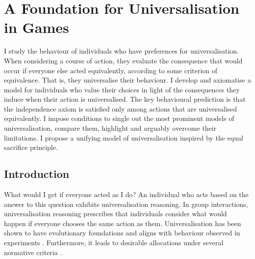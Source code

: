 \renewcommand{\thefootnote}{\fnsymbol{footnote}}

\chapter[A Foundation for Universalisation in Games]%
        {A Foundation for Universalisation in Games\protect\footnotemark}
\label{ch:univ}


\setcounter{footnote}{0}
\renewcommand{\thefootnote}{\arabic{footnote}}


\begin{chapterabstract}
	I study the behaviour of individuals who have preferences for universalisation. When considering a course of action, they evaluate the consequence that would occur if everyone else acted equivalently, according to some criterion of equivalence. That is, they universalise their behaviour. I develop and axiomatise a model for individuals who value their choices in light of the consequences they induce when their action is universalised. The key behavioural prediction is that the independence axiom is satisfied only among actions that are universalised equivalently. I impose conditions to single out the most prominent models of universalisation, compare them, highlight and arguably overcome their limitations. I propose a unifying model of universalisation inspired by the equal sacrifice principle.
\end{chapterabstract}

\section{Introduction}\label{sec:introuniv}

What would I get if everyone acted as I do? An individual who acts based on the answer to this question exhibits universalisation reasoning. In group interactions, universalisation reasoning prescribes that individuals consider what would happen if everyone chooses the same action as them. Universalisation has been shown to have evolutionary foundations \citep{algerHomoMoralisPreference2013} and aligns with behaviour observed in experiments \citep{levineLogicUniversalizationGuides2020,miettinenRevealedPreferencesSequential2020,vanleeuwenEstimatingSocialPreferences2024}. Furthermore, it leads to desirable allocations under several normative criteria \citep{roemerKantianEquilibrium2010}.

